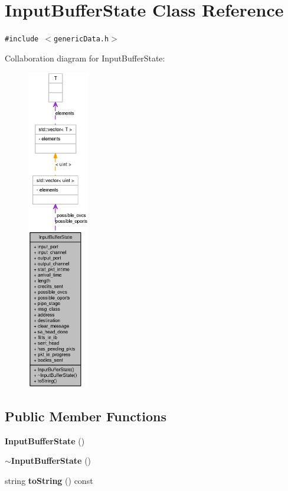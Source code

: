 \section{InputBufferState Class Reference}
\label{classInputBufferState}
{\tt \#include $<$genericData.h$>$}

Collaboration diagram for InputBufferState:\nopagebreak
\begin{figure}[H]
\begin{center}
\leavevmode
\includegraphics[height=400pt]{classInputBufferState__coll__graph}
\end{center}
\end{figure}
\subsection*{Public Member Functions}
\begin{CompactItemize}
\item 
{\bf InputBufferState} ()
\item 
{\bf $\sim$InputBufferState} ()
\item 
string {\bf toString} () const 
\end{CompactItemize}
